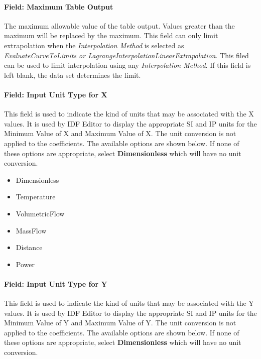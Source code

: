 \paragraph{Field: Maximum Table Output}\label{field-maximum-table-output-1}

The maximum allowable value of the table output. Values greater than the maximum will be replaced by the maximum. This field can only limit extrapolation when the \emph{Interpolation Method} is selected as \emph{EvaluateCurveToLimits or LagrangeInterpolationLinearExtrapolation}. This filed can be used to limit interpolation using any \emph{Interpolation Method}. If this field is left blank, the data set determines the limit.

\paragraph{Field: Input Unit Type for X}\label{field-input-unit-type-for-x-000}

This field is used to indicate the kind of units that may be associated with the X values. It is used by IDF Editor to display the appropriate SI and IP units for the Minimum Value of X and Maximum Value of X. The unit conversion is not applied to the coefficients. The available options are shown below. If none of these options are appropriate, select \textbf{Dimensionless} which will have no unit conversion.

\begin{itemize}
\item
  Dimensionless
\item
  Temperature
\item
  VolumetricFlow
\item
  MassFlow
\item
  Distance
\item
  Power
\end{itemize}

\paragraph{Field: Input Unit Type for Y}\label{field-input-unit-type-for-y-000}

This field is used to indicate the kind of units that may be associated with the Y values. It is used by IDF Editor to display the appropriate SI and IP units for the Minimum Value of Y and Maximum Value of Y. The unit conversion is not applied to the coefficients. The available options are shown below. If none of these options are appropriate, select \textbf{Dimensionless} which will have no unit conversion.

